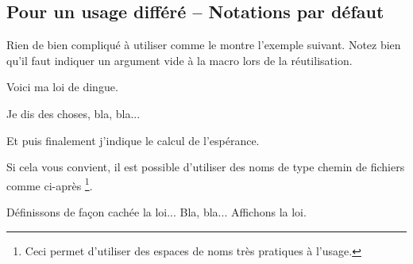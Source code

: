 \documentclass[12pt,a4paper]{article}
\begin{document}

\subsection{Pour un usage différé -- Notations par défaut} \label{tnsproba-calclexpval-name-n-reuse}

Rien de bien compliqué à utiliser comme le montre l'exemple suivant. Notez bien qu'il faut indiquer un argument vide à la macro  lors de la réutilisation.

\begin{latexex-flat}
Voici ma loi de dingue.


Je dis des choses, bla, bla...

Et puis finalement j'indique le calcul de l'espérance.

\calcexpval[disp  = exp,
            reuse = maloidedingue]{}
\end{latexex-flat}


\begin{remark}
	Si cela vous convient, il est possible d'utiliser des noms de type \og chemin de fichiers \fg{} comme ci-après
	\footnote{
		Ceci permet d'utiliser des espaces de noms très pratiques à l'usage.
	}.
	
\begin{latexex-flat}
Définissons de façon cachée la loi... %
%
Bla, bla... Affichons la loi.

\calcexpval[disp  = table,
            reuse = ma/loi/de/dingue]{}
\end{latexex-flat}
\end{remark}
\end{document}
